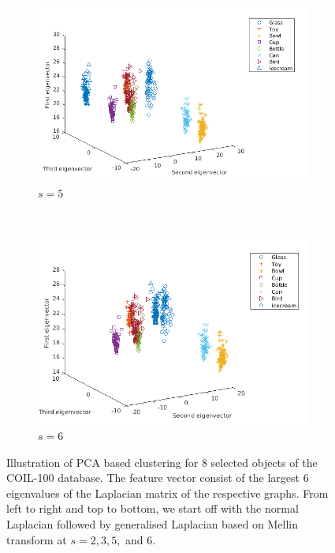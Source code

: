 \documentclass[10pt,a4paper]{article}
\begin{document}
\begin{figure}[H]
\begin{subfigure}[b]{0.5\textwidth}
		\includegraphics[width= \textwidth]{images/Mellin-s5.png}
		\caption{$s=5$}
		\label{}
	\end{subfigure}~
\begin{subfigure}[b]{0.5\textwidth}
	\includegraphics[width= \textwidth]{images/Mellin-s6.png}
	\caption{$s=6$}
	\label{}
\end{subfigure}
	\caption{Illustration of PCA based clustering for $8$ selected objects of the COIL-100 database. The feature vector consist of the largest $6$ eigenvalues of the Laplacian matrix of the respective graphs. From left to right and top to bottom, we start off with the normal Laplacian followed by generalised Laplacian based on Mellin transform at $s=2,3,5,$ and $6$. }
	\label{}
\end{figure}
\end{document}
